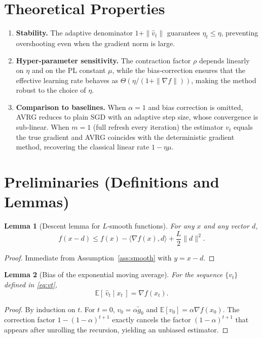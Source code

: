 \documentclass{article}
\newtheorem{lemma}{Lemma}[section]
\begin{document}
\section*{Theoretical Properties}
\begin{enumerate}[label=\arabic*.]
\item \textbf{Stability.}  The adaptive denominator $1+\|\hat v_t\|$
guarantees $\eta_t\le\eta$, preventing overshooting even when the
gradient norm is large.
\item \textbf{Hyper‑parameter sensitivity.}
The contraction factor $\rho$ depends linearly on $\eta$ and on the PL
constant $\mu$, while the bias‑correction ensures that the effective
learning rate behaves as $\Theta(\eta/(1+\|\nabla f\|))$, making the
method robust to the choice of $\eta$.
\item \textbf{Comparison to baselines.}
When $\alpha=1$ and bias correction is omitted, AVRG reduces to plain SGD
with an adaptive step size, whose convergence is sub‑linear.
When $m=1$ (full refresh every iteration) the estimator $v_t$ equals the
true gradient and AVRG coincides with the deterministic gradient method,
recovering the classical linear rate $1-\eta\mu$.
\end{enumerate}

\section*{Preliminaries (Definitions and Lemmas)}
\begin{lemma}[Descent lemma for $L$‑smooth functions]\label{lem:descent}
For any $x$ and any vector $d$, 
\[
f(x-d)\le f(x)-\langle\nabla f(x),d\rangle+\frac{L}{2}\|d\|^2 .
\]
\end{lemma}
\begin{proof}
Immediate from Assumption~\ref{ass:smooth} with $y=x-d$.
\end{proof}

\begin{lemma}[Bias of the exponential moving average]\label{lem:bias}
For the sequence $\{v_t\}$ defined in \eqref{eq:vt},
\[
\mathbb{E}[\,\hat v_t\mid x_t\,]=\nabla f(x_t).
\]
\end{lemma}
\begin{proof}
By induction on $t$.  For $t=0$, $v_0=\alpha\tilde g_0$ and
$\mathbb{E}[v_0]=\alpha\nabla f(x_0)$.  The correction factor
$1-(1-\alpha)^{t+1}$ exactly cancels the factor $(1-\alpha)^{t+1}$ that
appears after unrolling the recursion, yielding an unbiased estimator.
\end{proof}
\end{document}
